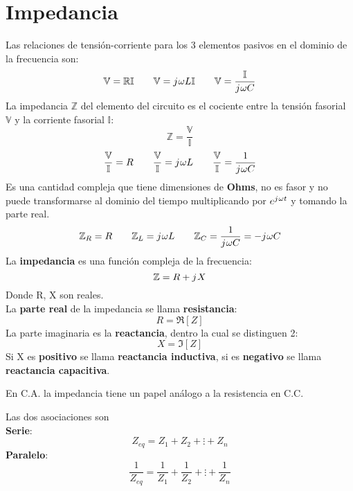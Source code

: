 \documentclass[
	12pt, %
	fleqn, %
	a4paper, %
	oneside, %
]{LegrandOrangeBook}
\begin{document}
\section{Impedancia}\label{sec:Impedancia}
Las relaciones de tensión-corriente para los 3 elementos pasivos en el dominio de la frecuencia son:
\begin{equation*}
\mathbb{V}=\mathbb{R}\mathbb{I}
\qquad
\mathbb{V}={j\mkern1mu}\omega L\mathbb{I}
\qquad
\mathbb{V}=\frac{\mathbb{I}}{{j\mkern1mu}\omega C}
\end{equation*}
La impedancia $\mathbb{Z}$ del elemento del circuito es el cociente entre la tensión fasorial $\mathbb{V}$ y la corriente fasorial $\mathbb{I}$:
\begin{displaymath}
\mathbb{Z}=\frac{\mathbb{V}}{\mathbb{I}}
\end{displaymath}
\begin{equation*}
\frac{\mathbb{V}}{\mathbb{I}}=R
\qquad
\frac{\mathbb{V}}{\mathbb{I}}={j\mkern1mu}\omega L
\qquad
\frac{\mathbb{V}}{\mathbb{I}}=\frac{1}{{j\mkern1mu}\omega C}
\end{equation*}
Es una cantidad compleja que tiene dimensiones de \textbf{Ohms}, no es fasor y no puede transformarse al dominio del tiempo multiplicando por $e^{{j\mkern1mu}\omega t}$ y tomando la parte real.
\begin{equation*}
\mathbb{Z}_R=R
\qquad
\mathbb{Z}_L={j\mkern1mu}\omega L
\qquad
\mathbb{Z}_C=\frac{1}{{j\mkern1mu}\omega C}=-{j\mkern1mu}\omega C
\end{equation*}
La \textbf{impedancia} es una función compleja de la frecuencia:
\begin{displaymath}
\mathbb{Z}=R+{j\mkern1mu} X
\end{displaymath}
Donde R, X son reales.\\
La \textbf{parte real} de la impedancia se llama \textbf{resistancia}:
\begin{displaymath}
R=\Re[Z]
\end{displaymath}
La parte imaginaria es la \textbf{reactancia}, dentro la cual se distinguen 2:
\begin{displaymath}
X=\Im[Z]
\end{displaymath}
Si X es \textbf{positivo} se llama \textbf{reactancia inductiva}, si es \textbf{negativo} se llama \textbf{reactancia capacitiva}.
\begin{remark}
En C.A. la impedancia tiene un papel análogo a la resistencia en C.C.
\end{remark}
\begin{definition}
Las dos asociaciones son\\
\textbf{Serie}:
\begin{equation}
Z_{eq}=Z_1+Z_2+\vdots+Z_n
\label{eq:serie impedancias}
\end{equation}
\textbf{Paralelo}:
\begin{equation}
\frac{1}{Z_{eq}}=\frac{1}{Z_1}+\frac{1}{Z_2}+\vdots+\frac{1}{Z_n}
\end{equation}
\end{definition}
\end{document}
